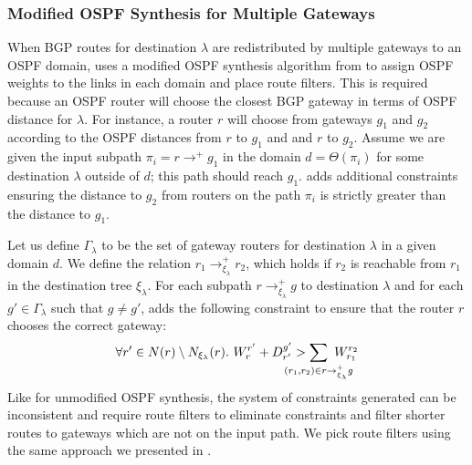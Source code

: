 \subsubsection{Modified OSPF Synthesis for Multiple Gateways}
When BGP routes for destination $\lambda$ 
are redistributed by multiple gateways to an 
OSPF domain, \name uses a modified OSPF synthesis
algorithm from  to assign OSPF weights to the links in each domain
and place route filters. 
This is 
required because an OSPF router will choose
the closest BGP gateway in terms of OSPF distance 
for $\lambda$. For instance, a router $r$ will choose
from gateways $g_1$ and $g_2$ according to the OSPF distances from $r$ to $g_1$ and
and $r$ to $g_2$. 
Assume we are given the input subpath $\pi_i=r \rightarrow^+ g_1$ in
the domain $d=\Theta(\pi_i)$ for some destination $\lambda$ outside
of $d$; this path should reach $g_1$. 
\name adds additional
constraints ensuring the distance to $g_2$ from routers
on the path $\pi_i$ is strictly
greater than the distance to $g_1$. 

Let us define $\Gamma_\lambda$ to be the set of gateway
routers for destination $\lambda$ in a given domain $d$. 
We define the relation $r_1 \rightarrow^+_{\xi_{\lambda}} r_2$, which holds if
$r_2$ is reachable from $r_1$ in the destination tree $\xi_\lambda$.
For each subpath $r \rightarrow^+_{\xi_{\lambda}} g$ to destination $\lambda$
and for each $g' \in \Gamma_{\lambda}$ such that $g\neq g'$,
\name adds the following constraint
to ensure that the  router $r$
chooses the correct gateway: 
\begin{multline} \label{eq:gateway}
\forall r' \in N(r) \setminus N_{\xi_\lambda}(r).~
W_r^{r'} + D_{r'}^{g'} > \sum_{\mathclap{\substack{(r_1,r_2) \in r \rightarrow^+_{\xi_{\lambda}} g }}} 
~W_{r_1}^{r_2}
\end{multline}
Like for unmodified OSPF synthesis, the system of
constraints generated can be inconsistent and require
route filters to eliminate constraints
and  filter shorter routes to gateways which are
not on the input path.
We pick route filters using the same approach we presented in
. 